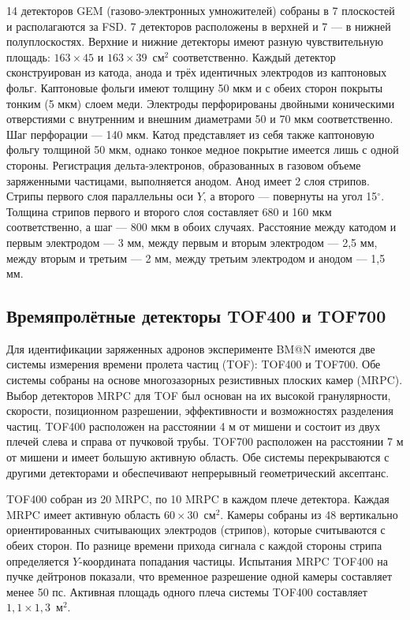14 детекторов GEM (газово-электронных умножителей) собраны в 7 плоскостей и располагаются за FSD.
7 детекторов расположены в верхней и 7 --- в нижней полуплоскостях.
Верхние и нижние детекторы имеют разную чувствительную площадь: $163\times45$ и $163\times39$~см$^2$ соответственно.
Каждый детектор сконструирован из катода, анода и трёх идентичных электродов из каптоновых фольг.
Каптоновые фольги имеют толщину 50 мкм и с обеих сторон покрыты тонким (5 мкм) слоем меди.
Электроды перфорированы двойными коническими отверстиями с внутренним и внешним диаметрами 50 и 70 мкм соответственно.
Шаг перфорации --- 140 мкм.
Катод представляет из себя также каптоновую фольгу толщиной 50 мкм, однако тонкое медное покрытие имеется лишь с одной стороны.
Регистрация дельта-электронов, образованных в газовом объеме заряженными частицами, выполняется анодом.
Анод имеет 2 слоя стрипов.
Стрипы первого слоя параллельны оси $Y$, а второго --- повернуты на угол 15$^\circ$.
Толщина стрипов первого и второго слоя составляет 680 и 160 мкм соответственно, а шаг --- 800 мкм в обоих случаях.
Расстояние между катодом и первым электродом --- 3 мм, между первым и вторым электродом --- 2,5 мм, между вторым и третьим --- 2 мм, между третьим электродом и анодом --- 1,5 мм.

\subsection{Времяпролётные детекторы TOF400 и TOF700}

Для идентификации заряженных адронов эксперименте BM@N имеются две системы измерения времени пролета частиц (TOF): TOF400 и TOF700.
Обе системы собраны на основе многозазорных резистивных плоских камер (MRPC).
Выбор детекторов MRPC для TOF был основан на их высокой гранулярности, скорости, позиционном разрешении, эффективности и возможностях разделения частиц. 
TOF400 расположен на расстоянии 4 м от мишени и состоит из двух плечей слева и справа от пучковой трубы. 
TOF700 расположен на расстоянии 7 м от мишени и имеет большую активную область. 
Обе системы перекрываются с другими детекторами и обеспечивают непрерывный геометрический аксептанс.

TOF400 собран из 20 MRPC, по 10 MRPC в каждом плече детектора. 
Каждая MRPC имеет активную область $60 \times 30$⁢~см$^2$.
Камеры собраны из 48 вертикально ориентированных считывающих электродов (стрипов), которые считываются с обеих сторон.
По разнице времени прихода сигнала с каждой стороны стрипа определяется $Y$-координата попадания частицы.
Испытания MRPC TOF400 на пучке дейтронов показали, что временное разрешение одной камеры составляет менее 50 пс. 
Активная площадь одного плеча системы TOF400 составляет $1,1 \times 1,3$~м$^2$. 

